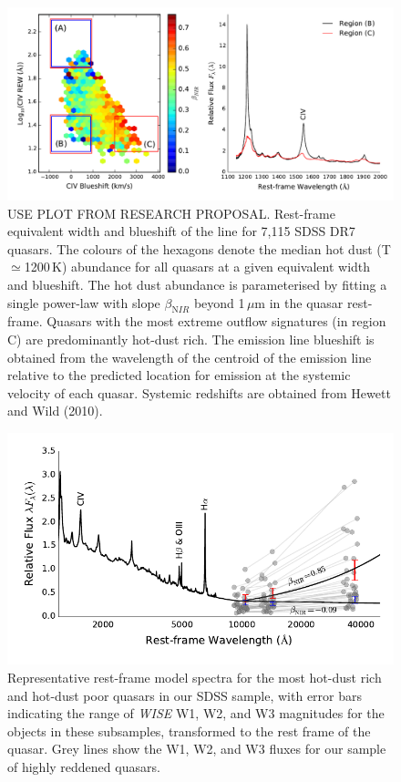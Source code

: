 \begin{figure}
\centering
  \includegraphics[width=\columnwidth]{figures/chapter06/ntt_proposal_figure1.pdf}
\caption{USE PLOT FROM RESEARCH PROPOSAL. Rest-frame equivalent width and blueshift of the
 line for 7,115 SDSS DR7 quasars. The colours of the hexagons
denote the median hot dust (T$\simeq$1200\,K) abundance for all
quasars at a given equivalent width and blueshift. The hot dust
abundance is parameterised by fitting a single power-law with slope
$\beta_{\mathrm NIR}$ beyond 1\,$\mu$m in the quasar rest-frame. Quasars
with the most extreme outflow signatures (in region C) are predominantly
hot-dust rich. The  emission line blueshift is obtained from
the wavelength of the centroid of the emission line relative to the
predicted location for emission at the systemic velocity of each
quasar. Systemic redshifts are obtained from Hewett and Wild (2010).}
  \label{fig:}
\end{figure}

\begin{figure}
\centering
  \includegraphics[width=\columnwidth]{figures/chapter06/ntt_proposal_figure2.pdf}
\caption{Representative rest-frame model spectra for the
most hot-dust rich and hot-dust poor quasars in our SDSS sample, with
error bars indicating the range of {\it WISE} W1, W2, and W3
magnitudes for the objects in these subsamples, transformed to the
rest frame of the quasar. Grey lines show the W1, W2, and W3 fluxes
for our sample of highly reddened quasars.}
  \label{fig:}
\end{figure}

